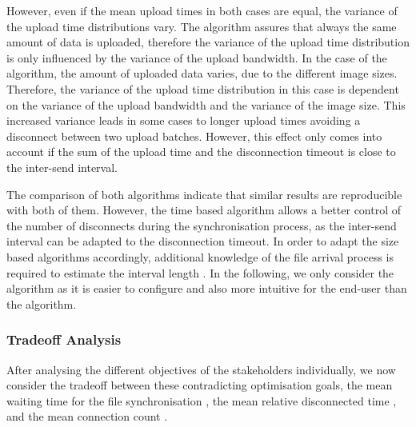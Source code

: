 However, even if the mean upload times in both cases are equal, the variance of the upload time distributions vary.
The \algosize algorithm assures that always the same amount of data is uploaded, therefore the variance of the upload time distribution is only influenced by the variance of the upload bandwidth.
In the case of the \algointerval algorithm, the amount of uploaded data varies, due to the different image sizes.
Therefore, the variance of the upload time distribution in this case is dependent on the variance of the upload bandwidth and the variance of the image size.
This increased variance leads in some cases to longer upload times avoiding a disconnect between two upload batches.
However, this effect only comes into account if the sum of the upload time and the disconnection timeout is close to the inter-send interval.

The comparison of both algorithms indicate that similar results are reproducible with both of them.
However, the time based algorithm allows a better control of the number of disconnects during the synchronisation process, as the inter-send interval can be adapted to the disconnection timeout. 
In order to adapt the size based algorithms accordingly, additional knowledge of the file arrival process is required to estimate the interval length \thresholdInterval.
In the following, we only consider the \algointerval algorithm as it is easier to configure and also more intuitive for the end-user than the \algosize algorithm. 

\subsubsection*{Tradeoff Analysis}\label{sec:application:cloud_file_synchronisation:numerical_evaluation:trade_off_analysis}

After analysing the different objectives of the stakeholders individually, we now consider the tradeoff between these contradicting optimisation goals, the mean waiting time for the file synchronisation \sojournTime, the mean relative disconnected time \relativeDisconnectedTime, and the mean connection count \connectionCount.

